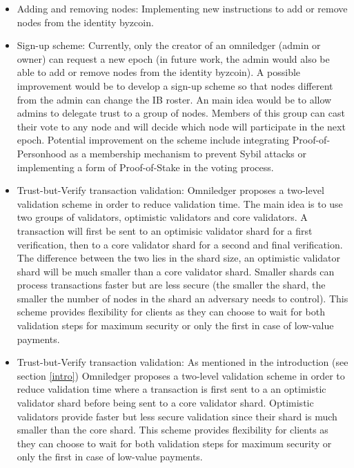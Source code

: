 \begin{itemize}
	\item Adding and removing nodes: Implementing new instructions to add or remove nodes from the identity byzcoin. 
	
	\item Sign-up scheme: Currently, only the creator of an omniledger (admin or owner) can request a new epoch (in future work, the admin would also be able to add or remove nodes from the identity byzcoin). A possible improvement would be to develop a sign-up scheme so that nodes different from the admin can change the IB roster. An main idea would be to allow admins to delegate trust to a group of nodes. Members of this group can cast their vote to any node and will decide which node will participate in the next epoch. Potential improvement on the scheme include integrating Proof-of-Personhood\cite{borge_proof--personhood:_2017} as a membership mechanism to prevent Sybil attacks or implementing a form of Proof-of-Stake\cite{proof-of-stake} in the voting process.
	
	\item Trust-but-Verify transaction validation: Omniledger proposes a two-level validation scheme in order to reduce validation time. The main idea is to use two groups of validators, optimistic validators and core validators. A transaction will first be sent to an optimisic validator shard for a first verification, then to a core validator shard for a second and final verification. The difference between the two lies in the shard size, an optimistic validator shard will be much smaller than a core validator shard. Smaller shards can process transactions faster but are less secure (the smaller the shard, the smaller the number of nodes in the shard an adversary needs to control). This scheme provides flexibility for clients as they can choose to wait for both validation steps for maximum security or only the first in case of low-value payments.
	
	\item Trust-but-Verify transaction validation: As mentioned in the introduction (see section \ref{intro}) Omniledger proposes a two-level validation scheme in order to reduce validation time where a transaction is first sent to a an optimistic validator shard before being sent to a core validator shard. Optimistic validators provide faster but less secure validation since their shard is much smaller than the core shard. This scheme provides flexibility for clients as they can choose to wait for both validation steps for maximum security or only the first in case of low-value payments.
\end{itemize}